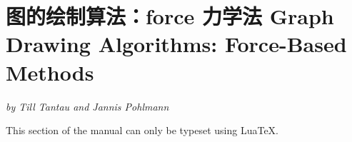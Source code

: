 %
%
%


\section{图的绘制算法：force 力学法 Graph Drawing Algorithms: Force-Based Methods}
\label{section-library-graphdrawing-force-based}

{\emph{by Till Tantau and Jannis Pohlmann}}

\ifluatex
\else
    This section of the manual can only be typeset using Lua\TeX.
    \expandafter\endinput
\fi


\includeluadocumentationof{pgf.gd.force.library}

\includeluadocumentationof{pgf.gd.force.ControlDeclare}
\includeluadocumentationof{pgf.gd.force.ControlStart}
\includeluadocumentationof{pgf.gd.force.ControlIteration}
\includeluadocumentationof{pgf.gd.force.ControlSprings}
\includeluadocumentationof{pgf.gd.force.ControlElectric}
\includeluadocumentationof{pgf.gd.force.ControlCoarsening}

\includeluadocumentationof{pgf.gd.force.SpringLayouts}
\includeluadocumentationof{pgf.gd.force.SpringHu2006}

\includeluadocumentationof{pgf.gd.force.SpringElectricalLayouts}
\includeluadocumentationof{pgf.gd.force.SpringElectricalHu2006}
\includeluadocumentationof{pgf.gd.force.SpringElectricalWalshaw2000}


